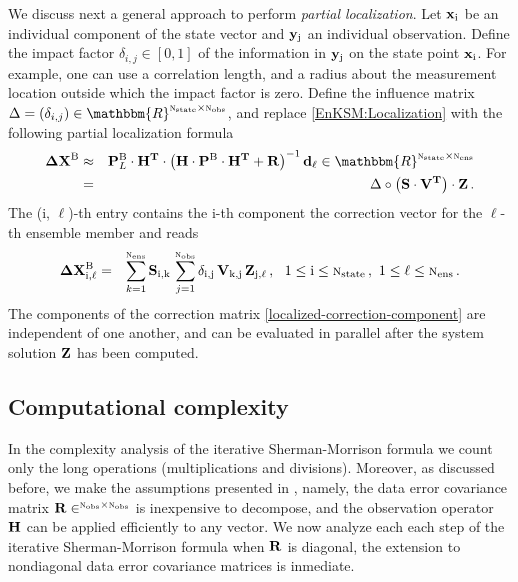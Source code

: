 \documentclass[12pt]{article}
\newcommand{\Nobs}{\textsc{n}_{{\rm obs}}}
\newcommand{\Nens}{\textsc{n}_{{\rm ens}}}
\newcommand{\Nstate}{\textsc{n}_{{\rm state}}}
\newcommand{\DXB}{{\bf \Delta X}^{\rm B}}
\newcommand{\PB}{{\bf P}^{\rm B}}
\newcommand{\R}{{\bf R}}
\renewcommand{\S}{{\bf S}}
\newcommand{\Z}{{\bf Z}}
\renewcommand{\d}[1]{{\bf d}_{\rm #1}}
\newcommand{\V}{{\bf V}}
\newcommand{\y}[1]{{\bf y}_{{\rm #1}}}
\newcommand{\Lo}{{\bf H}}
\renewcommand{\Re}{\mathbbm{R}}
\newcommand{\x}{{\bf x}}
\begin{document}
We discuss next a general approach to perform {\em partial localization}.
Let $\x_{\rm i}$ be an individual component of the state vector and $\y{j}$ an individual observation. Define the impact factor $\delta_{i,j} \in [0,1]$
of the information in $\y{j}$ on the state point $\x_{\rm i}$. For example, one can use a
correlation length, and a radius about the measurement location outside which  the impact factor is zero.
Define the influence matrix $\Delta = (\delta_{i,j}) \in \Re^{\Nstate \times \Nobs}$, and
replace \eqref{EnKSM:Localization} with the following partial localization formula
\begin{eqnarray*}  
\DXB  &\approx& \PB_L  \cdot {\Lo}^{{\bf T}} \cdot \left ( {\Lo}  \cdot \PB \cdot {\Lo}^{{\bf T}} + \R \right )^{-1} \d{\ell} \in \Re^{\Nstate \times \Nens} \\
&=& \Delta \circ \left( \S \cdot \V^{\bf T} \right) \cdot \Z \,.
\end{eqnarray*}
The (i, $\ell$)-th entry contains the i-th component the correction vector for the $\ell$-th ensemble member and reads
\begin{eqnarray}  
\label{localized-correction-component}
\DXB_{\rm i, \ell} &=& \sum_{k=1}^{\Nens}  \S_{\rm i,\rm k} \, \sum_{j=1}^{\Nobs} \delta_{\rm i, \rm j}\, \V_{\rm k,\rm j}  \, \Z_{\rm j, \ell} 
\,,~~ 1 \le \rm i \le \Nstate\,,~ 1 \le \ell \le \Nens\,.
\end{eqnarray}
The components of the correction matrix \eqref{localized-correction-component} are independent of one another, and can be evaluated in parallel
after the system solution $\Z$ has been computed.



\subsection{Computational complexity}
\label{Sec:computational-complexity}


In the complexity analysis of the iterative Sherman-Morrison formula we count only the long operations (multiplications and divisions). Moreover, as discussed before, we make the assumptions presented in \cite{Tippett2003,Jan06}, namely, the data error covariance matrix $\R \in ^{\Nobs \times \Nobs}$ is inexpensive to decompose, and the observation operator $\Lo$ can be applied efficiently to any vector. We now analyze each each step of the iterative Sherman-Morrison formula when $\R$ is diagonal, the extension to nondiagonal data error covariance matrices is inmediate.
\end{document}
